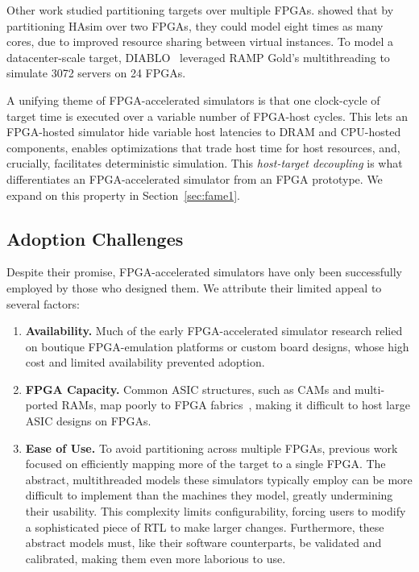 Other work studied partitioning targets over multiple FPGAs.
\cite{LIFPGADesign} showed that by partitioning HAsim over two FPGAs, they
could model eight times as many cores, due to improved resource sharing between
virtual instances. To model a datacenter-scale target, DIABLO~\cite{Diablo}
leveraged RAMP Gold's multithreading to simulate 3072 servers on 24 FPGAs.

A unifying theme of FPGA-accelerated simulators is that one clock-cycle of
target time is executed over a variable number of FPGA-host
cycles.  This lets an FPGA-hosted simulator hide
variable host latencies to DRAM and CPU-hosted components, enables
optimizations that trade host time for host resources, and, crucially,
facilitates deterministic simulation.  This \emph{host-target
decoupling} is what differentiates an FPGA-accelerated simulator from
an FPGA prototype. We expand on this property in
Section~\ref{sec:fame1}.

\subsection{Adoption Challenges}

Despite their promise, FPGA-accelerated simulators have only been
successfully employed by those who designed them. We attribute their
limited appeal to several factors:

\begin{enumerate}

    \item \textbf{Availability.} Much of the early FPGA-accelerated
    simulator research relied on boutique FPGA-emulation
    platforms or custom board designs, whose high cost and
    limited availability prevented adoption.

    \item \textbf{FPGA Capacity.} Common ASIC structures, such as CAMs and
        multi-ported RAMs, map poorly to FPGA
        fabrics~\cite{FPGAGap2}, making it difficult to host large
        ASIC designs on FPGAs.

    \item \textbf{Ease of Use.} To avoid partitioning across multiple
     FPGAs, previous work focused on efficiently mapping more of the
     target to a single FPGA. The abstract, multithreaded models these
     simulators typically employ can be more difficult to implement
     than the machines they model, greatly undermining their
     usability. This complexity limits configurability, forcing users
     to modify a sophisticated piece of RTL to make larger
     changes. Furthermore, these abstract models must, like their
     software counterparts, be validated and calibrated, making them
     even more laborious to use.
\end{enumerate}

